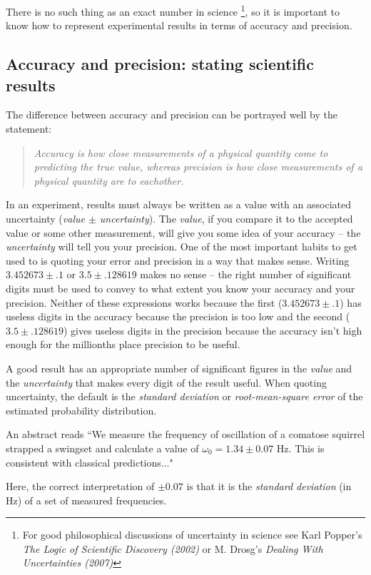  There is no such thing as an exact number in science \footnote{For good philosophical discussions of uncertainty in science see Karl Popper's \emph{The Logic of Scientific Discovery (2002)} or M. Drosg's  \emph{Dealing With Uncertainties (2007)}}, so it is important to know how to represent experimental results in terms of accuracy and precision.


\subsection{Accuracy and precision: stating scientific results}
The difference between accuracy and precision can be portrayed well by the statement:
\begin{quote}
{\it Accuracy is how close measurements of a physical quantity come to predicting the true value, whereas precision is how close measurements of a physical quantity are to eachother.}
\end{quote}

In an experiment, results must always be written as a value with an associated uncertainty (\emph{value $\pm$ uncertainty}). The \emph{value}, if you compare it to the accepted value or some other measurement, will give you some idea of your accuracy -- the \emph{uncertainty} will tell you your precision. One of the most important habits to get used to is quoting your error and precision in a way that makes sense. Writing $3.452673 \pm .1$  or $3.5 \pm .128619$ makes no sense -- the right number of significant digits must be used to convey to what extent you know your accuracy and your precision. Neither of these expressions works because the first ($3.452673 \pm .1$) has useless digits in the accuracy because the precision is too low and the second ($3.5 \pm .128619$) gives useless digits in the precision because the accuracy isn't high enough for the millionths place precision to be useful.

A good result has an appropriate number of significant figures in the \emph{value} and the \emph{uncertainty} that makes every digit of the result useful. When quoting uncertainty, the default is the \emph{standard deviation} or \emph{root-mean-square error} of the estimated probability distribution.  

\begin{example}
 An abstract reads ``We measure the frequency of oscillation of a comatose squirrel strapped a swingset and calculate a value of $\omega_0 = 1.34 \pm 0.07$ Hz. This is consistent with classical predictions..."

Here, the correct interpretation of $\pm 0.07$ is that it is the \emph{standard deviation} (in Hz) of a set of measured frequencies.
\end{example}

